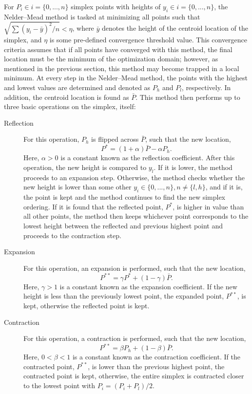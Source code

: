 For $P_i \in i=\{0,...,n\}$ simplex points with heights of $y_i \in i=\{0,...,n\}$, the Nelder--Mead method is tasked at minimizing all points such that $\sqrt{\sum(y_i-\bar y)^2/n} < \eta$, where $\bar y$ denotes the height of the centroid location of the simplex, and $\eta$ is some pre-defined convergence threshold value.
This convergence criteria assumes that if all points have converged with this method, the final location must be the minimum of the optimization domain; however, as mentioned in the previous section, this method may become trapped in a local minimum.
At every step in the Nelder--Mead method, the points with the highest and lowest values are determined and denoted as $P_h$ and $P_l$, respectively.
In addition, the centroid location is found as $\bar P$.
This method then performs up to three basic operations on the simplex, itself:

\begin{description}

\item[Reflection] For this operation, $P_h$ is flipped across $\bar P$, such that the new location,
\begin{equation}
P^* = (1+\alpha)\bar P - \alpha P_h.
\end{equation}
\noindent Here, $\alpha > 0$ is a constant known as the reflection coefficient.
After this operation, the new height is compared to $y_l$.
If it is lower, the method proceeds to an expansion step.
Otherwise, the method checks whether the new height is lower than some other $y_i \in \{0,...,n\},n\neq \{l,h\}$, and if it is, the point is kept and the method continues to find the new simplex ordering.
If it is found that the reflected point, $P^*$, is higher in value than all other points, the method then keeps whichever point corresponds to the lowest height between the reflected and previous highest point and proceeds to the contraction step.

\item[Expansion] For this operation, an expansion is performed, such that the new location,
\begin{equation}
P^{**} = \gamma P^* + (1-\gamma)\bar P.
\end{equation}
\noindent Here, $\gamma > 1$ is a constant known as the expansion coefficient.
If the new height is less than the previously lowest point, the expanded point, $P^{**}$, is kept, otherwise the reflected point is kept.

\item[Contraction] For this operation, a contraction is performed, such that the new location,
\begin{equation}
P^{**} = \beta P_h + (1-\beta)\bar P.
\end{equation}
\noindent Here, $0 < \beta < 1$ is a constant known as the contraction coefficient.
If the contracted point, $P^{**}$, is lower than the previous highest point, the contracted point is kept, otherwise, the entire simplex is contracted closer to the lowest point with $P_i = (P_i + P_l)/2$.
\end{description}

